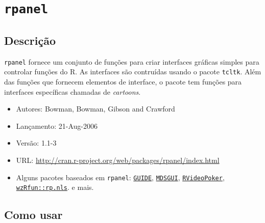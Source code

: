 \section{\texttt{rpanel}}

\subsection*{Descrição}


\begin{frame}

  \texttt{rpanel} fornece um conjunto de funções para criar interfaces
  gráficas simples para controlar funções do R. As interfaces são
  contruídas usando o pacote \texttt{tcltk}. Além das funções que
  fornecem elementos de interface, o pacote tem funções para interfaces
  específicas chamadas de \emph{cartoons}.

  \begin{itemize}
  \item Autores: Bowman, Bowman, Gibson and Crawford
  \item Lançamento: 21-Aug-2006
  \item Versão: 1.1-3
  \item URL:
    \url{http://cran.r-project.org/web/packages/rpanel/index.html}
\end{itemize}

\end{frame}

\begin{frame}

\begin{itemize}
\item Alguns pacotes baseados em \texttt{rpanel}:
  \href{http://cran.r-project.org/web/packages/GUIDE/index.html}{\texttt{GUIDE}},
  \href{http://cran.r-project.org/web/packages/MDSGUI/index.html}{\texttt{MDSGUI}},
  \href{http://cran.r-project.org/web/packages/RVideoPoker/index.html}{\texttt{RVideoPoker}},
  \href{https://github.com/walmes/wzRfun/blob/master/R/rp.nls.R}{\texttt{wzRfun::rp.nls}}.
  e mais.
\end{itemize}

\end{frame}


\subsection*{Como usar}

